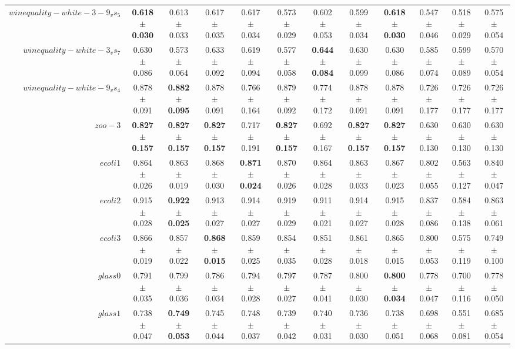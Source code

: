 \begin{table}[!ht]
{\begin{tabular}{r c c c c c c c c c c c}
$winequality-white-3-9_vs_5$ & \textbf{0.618 $\pm$ 0.030} & 0.613 $\pm$ 0.033 & 0.617 $\pm$ 0.035 & 0.617 $\pm$ 0.034 & 0.573 $\pm$ 0.029 & 0.602 $\pm$ 0.053 & 0.599 $\pm$ 0.034 & \textbf{0.618 $\pm$ 0.030} & 0.547 $\pm$ 0.046 & 0.518 $\pm$ 0.029 & 0.575 $\pm$ 0.054 \\
$winequality-white-3_vs_7$ & 0.630 $\pm$ 0.086 & 0.573 $\pm$ 0.064 & 0.633 $\pm$ 0.092 & 0.619 $\pm$ 0.094 & 0.577 $\pm$ 0.058 & \textbf{0.644 $\pm$ 0.084} & 0.630 $\pm$ 0.099 & 0.630 $\pm$ 0.086 & 0.585 $\pm$ 0.074 & 0.599 $\pm$ 0.089 & 0.570 $\pm$ 0.054 \\
$winequality-white-9_vs_4$ & 0.878 $\pm$ 0.091 & \textbf{0.882 $\pm$ 0.095} & 0.878 $\pm$ 0.091 & 0.766 $\pm$ 0.164 & 0.879 $\pm$ 0.092 & 0.774 $\pm$ 0.172 & 0.878 $\pm$ 0.091 & 0.878 $\pm$ 0.091 & 0.726 $\pm$ 0.177 & 0.726 $\pm$ 0.177 & 0.726 $\pm$ 0.177 \\
$zoo-3$ & \textbf{0.827 $\pm$ 0.157} & \textbf{0.827 $\pm$ 0.157} & \textbf{0.827 $\pm$ 0.157} & 0.717 $\pm$ 0.191 & \textbf{0.827 $\pm$ 0.157} & 0.692 $\pm$ 0.167 & \textbf{0.827 $\pm$ 0.157} & \textbf{0.827 $\pm$ 0.157} & 0.630 $\pm$ 0.130 & 0.630 $\pm$ 0.130 & 0.630 $\pm$ 0.130 \\
$ecoli1$ & 0.864 $\pm$ 0.026 & 0.863 $\pm$ 0.019 & 0.868 $\pm$ 0.030 & \textbf{0.871 $\pm$ 0.024} & 0.870 $\pm$ 0.026 & 0.864 $\pm$ 0.028 & 0.863 $\pm$ 0.033 & 0.867 $\pm$ 0.023 & 0.802 $\pm$ 0.055 & 0.563 $\pm$ 0.127 & 0.840 $\pm$ 0.047 \\
$ecoli2$ & 0.915 $\pm$ 0.028 & \textbf{0.922 $\pm$ 0.025} & 0.913 $\pm$ 0.027 & 0.914 $\pm$ 0.027 & 0.919 $\pm$ 0.029 & 0.911 $\pm$ 0.021 & 0.914 $\pm$ 0.027 & 0.915 $\pm$ 0.028 & 0.837 $\pm$ 0.086 & 0.584 $\pm$ 0.138 & 0.863 $\pm$ 0.061 \\
$ecoli3$ & 0.866 $\pm$ 0.019 & 0.857 $\pm$ 0.022 & \textbf{0.868 $\pm$ 0.015} & 0.859 $\pm$ 0.025 & 0.854 $\pm$ 0.035 & 0.851 $\pm$ 0.028 & 0.861 $\pm$ 0.018 & 0.865 $\pm$ 0.015 & 0.800 $\pm$ 0.053 & 0.575 $\pm$ 0.119 & 0.749 $\pm$ 0.100 \\
$glass0$ & 0.791 $\pm$ 0.035 & 0.799 $\pm$ 0.036 & 0.786 $\pm$ 0.034 & 0.794 $\pm$ 0.028 & 0.797 $\pm$ 0.027 & 0.787 $\pm$ 0.041 & 0.800 $\pm$ 0.030 & \textbf{0.800 $\pm$ 0.034} & 0.778 $\pm$ 0.047 & 0.700 $\pm$ 0.116 & 0.778 $\pm$ 0.050 \\
$glass1$ & 0.738 $\pm$ 0.047 & \textbf{0.749 $\pm$ 0.053} & 0.745 $\pm$ 0.044 & 0.748 $\pm$ 0.037 & 0.739 $\pm$ 0.042 & 0.740 $\pm$ 0.031 & 0.736 $\pm$ 0.030 & 0.738 $\pm$ 0.051 & 0.698 $\pm$ 0.068 & 0.551 $\pm$ 0.081 & 0.685 $\pm$ 0.054 \\

\end{tabular}}
\end{table}
